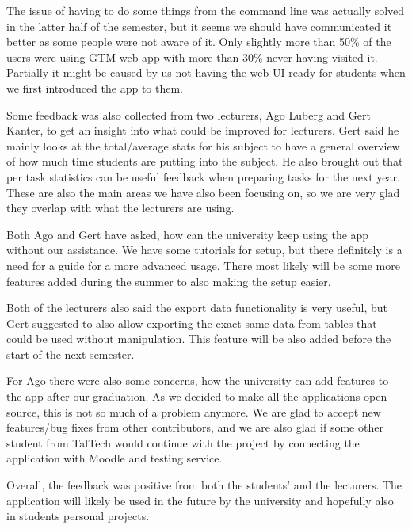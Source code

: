 The issue of having to do some things from the command line was actually solved in the latter half of the semester, but it seems
we should have communicated it better as some people were not aware of it.
Only slightly more than 50\% of the users were using GTM web app with more than 30\% never having visited it.
Partially it might be caused by us not having the web UI ready for students when we first introduced the app to them.

Some feedback was also collected from two lecturers, Ago Luberg and Gert Kanter, to get an insight into what could be improved for lecturers.
Gert said he mainly looks at the total/average stats for his subject to have a general overview of how much time students are
putting into the subject.
He also brought out that per task statistics can be useful feedback when preparing tasks for the next year.
These are also the main areas we have also been focusing on, so we are very glad they overlap with what the lecturers are using.

Both Ago and Gert have asked, how can the university keep using the app without our assistance.
We have some tutorials for setup, but there definitely is a need for a guide for a more advanced usage.
There most likely will be some more features added during the summer to also making the setup easier.

Both of the lecturers also said the export data functionality is very useful, but Gert suggested to also allow
exporting the exact same data from tables that could be used without manipulation.
This feature will be also added before the start of the next semester.

For Ago there were also some concerns, how the university can add features to the app after our graduation.
As we decided to make all the applications open source, this is not so much of a problem anymore.
We are glad to accept new features/bug fixes from other contributors, and we are also glad if some other student from TalTech
would continue with the project by connecting the application with Moodle and testing service.

Overall, the feedback was positive from both the students' and the lecturers.
The application will likely be used in the future by the university and hopefully also in students personal projects.